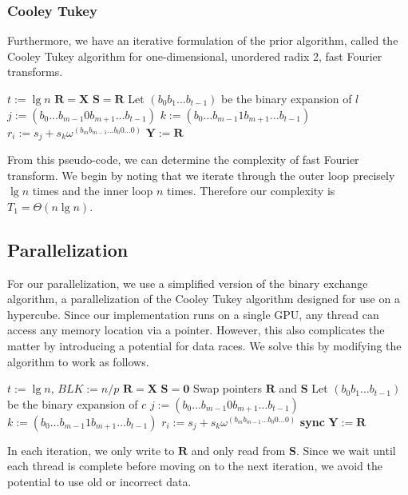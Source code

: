 \documentclass[notitlepage, twocolumn]{article}
\begin{document}
\subsubsection{Cooley Tukey}

Furthermore, we have an iterative formulation of the prior algorithm, called the Cooley Tukey algorithm for one-dimensional, unordered radix 2, fast Fourier transforms.

\begin{algorithmic}[1]
		\State $t:=\lg n$
		\State $\mathbf{R}=\mathbf{X}$
			\State $\mathbf{S}=\mathbf{R}$
				\State Let $(b_0b_1\ldots b_{t-1})$ be the binary expansion of $l$
				\State $j:=(b_0\ldots b_{m-1}0b_{m+1}\ldots b_{t-1})$
				\State $k:=(b_0\ldots b_{m-1}1b_{m+1}\ldots b_{t-1})$
				\State $r_i:= s_j+s_k\omega^{(b_mb_{m-1}\ldots b_0 0\ldots0)}$
			\EndFor
		\EndFor
		\State $\mathbf{Y}:=\mathbf{R}$
	\EndFunction
\end{algorithmic}

From this pseudo-code, we can determine the complexity of fast Fourier transform.
We begin by noting that we iterate through the outer loop precisely $\lg n$ times and the inner loop $n$ times.
Therefore our complexity is $T_1=\Theta(n\lg n)$.

\subsection{Parallelization}

For our parallelization, we use a simplified version of the binary exchange algorithm, a parallelization of the Cooley Tukey algorithm designed for use on a hypercube.
Since our implementation runs on a single GPU, any thread can access any memory location via a pointer.
However, this also complicates the matter by introducing a potential for data races.
We solve this by modifying the algorithm to work as follows.

\begin{algorithmic}[1]
		\State $t:=\lg n$, $BLK:=n/p$
		\State $\mathbf{R}=\mathbf{X}$
		\State $\mathbf{S}=\mathbf{0}$
			\State Swap pointers $\mathbf{R}$ and $\mathbf{S}$
					\State Let $(b_0b_1\ldots b_{t-1})$ be the binary expansion of $c$
					\State $j:=(b_0\ldots b_{m-1}0b_{m+1}\ldots b_{t-1})$
					\State $k:=(b_0\ldots b_{m-1}1b_{m+1}\ldots b_{t-1})$
					\State $r_i:= s_j+s_k\omega^{(b_mb_{m-1}\ldots b_0 0\ldots0)}$
				\EndFor
			\EndSpawn
			\State \textbf{sync}
		\EndFor
		\State $\mathbf{Y}:=\mathbf{R}$
	\EndFunction
\end{algorithmic}
In each iteration, we only write to $\mathbf{R}$ and only read from $\mathbf{S}$.
Since we wait until each thread is complete before moving on to the next iteration, we avoid the potential to use old or incorrect data.
\end{document}
